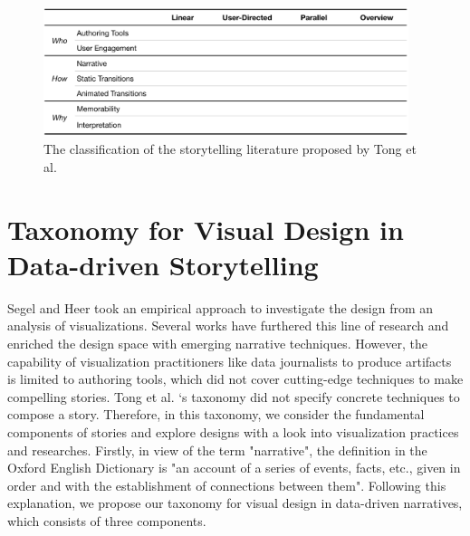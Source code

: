 \begin{figure}[H]
	\centering 
	\includegraphics[width=0.95\textwidth]{figure/taxonomy2.png} 
	\caption{ The classification of the storytelling literature proposed by Tong et al. \cite{Tong2018} } 
	\label{taxonomy2} 
\end{figure}

\section{Taxonomy for Visual Design in Data-driven Storytelling}

Segel and Heer \cite{Segel2010} took an empirical approach to investigate the design from an analysis of visualizations. Several works \cite{Bach2018, Stolper2016, McKenna2017} have furthered this line of research and enriched the design space with emerging narrative techniques. However, the capability of visualization practitioners like data journalists to produce artifacts is limited to authoring tools, which did not cover cutting-edge techniques to make compelling stories. Tong et al. ‘s taxonomy did not specify concrete techniques to compose a story. 
Therefore, in this taxonomy, we consider the fundamental components of stories and explore designs with a look into visualization practices and researches. Firstly, in view of the term "narrative", the definition in the Oxford English Dictionary \cite{oed} is "an account of a series of events, facts, etc., given in order and with the establishment of connections between them". Following this explanation, we propose our taxonomy for visual design in data-driven narratives, which consists of three components.


